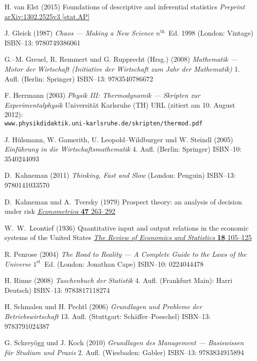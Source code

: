 \begin{thebibliography}{99}
H. van Elst
(2015) Foundations of descriptive and inferential statistics
\emph{Preprint} 
\href{http://arxiv.org/abs/1302.2525}{arXiv:1302.2525v3 [stat.AP]}

J. Gleick
(1987) \emph{Chaos --- Making a New Science}
$n^{\text{th}}$~Ed. 1998 (London: Vintage)
ISBN--13: 9780749386061

G.--M. Greuel, R. Remmert und G. Rupprecht (Hrsg.)
(2008) \emph{Mathematik --- Motor der Wirtschaft (Initiative der
Wirtschaft zum Jahr der Mathematik)}
1. Aufl. (Berlin: Springer) ISBN--13: 9783540786672

F. Herrmann
(2003) 
\emph{Physik III: Thermodynamik --- Skripten zur 
Experimentalphysik} Universit\"at Karlsruhe (TH) 
URL (zitiert am 10. August 2012): \\
{\tt www.physikdidaktik.uni-karlsruhe.de/skripten/thermod.pdf}

J. H\"ulsmann, W. Gamerith, U. Leopold--Wildburger und W. Steindl
(2005) \emph{Einf\"uhrung in die Wirtschaftsmathematik}
4. Aufl. (Berlin: Springer) ISBN--10: 3540244093

D.~Kahneman
(2011) \emph{Thinking, Fast and Slow} (London: Penguin)
ISBN--13: 9780141033570

D.~Kahneman und A.~Tversky
(1979) Prospect theory: an analysis of decision under risk 
\href{http://www.jstor.org/stable/1914185}{\emph{Econometrica} 
{\bf 47} 263--292}

W.~W.~Leontief
(1936) Quantitative input and output relations in the economic 
systems of the United States
\href{http://dx.doi.org/10.2307/1927837}{\emph{The Review of 
Economics and Statistics} {\bf 18} 105--125}

R. Penrose
(2004) \emph{The Road to Reality --- A Complete Guide to the Laws
of the Universe}
$1^{\text{st}}$~Ed. (London: Jonathan Cape) ISBN--10: 0224044478

H. Rinne
(2008) \emph{Taschenbuch der Statistik}
4. Aufl. (Frankfurt Main): Harri Deutsch)
ISBN--13: 9783817118274

H. Schmalen und H. Pechtl
(2006) \emph{Grundlagen und Probleme der Betriebswirtschaft}
13. Aufl. (Stuttgart: Sch\"affer--Poeschel) ISBN--13:
9783791024387

G. Schrey\"ogg und J. Koch
(2010) \emph{Grundlagen des Management --- Basiswissen f\"ur 
Studium und Praxis} 2. Aufl. (Wiesbaden: Gabler) ISBN--13: 
9783834915894


\end{thebibliography}
